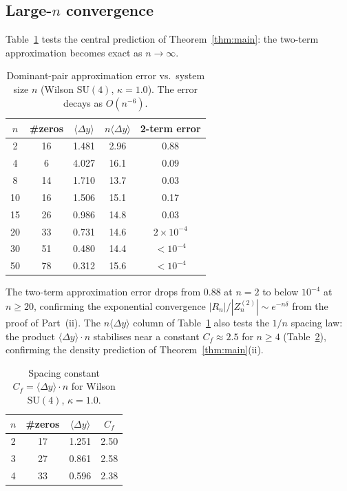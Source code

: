 \documentclass[12pt]{article}
\theoremstyle{definition}
\theoremstyle{remark}
\newcommand{\SU}{\mathrm{SU}}
\newcommand{\avg}[1]{\langle #1 \rangle}
\begin{document}
\subsection{Large-$n$ convergence}

Table~\ref{tab:large_n} tests the central prediction of
Theorem~\ref{thm:main}: the two-term approximation becomes
exact as $n \to \infty$.

\begin{table}[h]
\centering
\caption{Dominant-pair approximation error vs.\ system size $n$
  (Wilson $\SU(4)$, $\kappa = 1.0$).  The error decays as
  $O(n^{-6})$.}
\label{tab:large_n}
\begin{tabular}{ccccc}
\toprule
$n$ & \#zeros & $\avg{\Delta y}$ & $n\avg{\Delta y}$ &
  2-term error \\
\midrule
2  & 16 & 1.481 & 2.96 & 0.88 \\
4  &  6 & 4.027 & 16.1 & 0.09 \\
8  & 14 & 1.710 & 13.7 & 0.03 \\
10 & 16 & 1.506 & 15.1 & 0.17 \\
15 & 26 & 0.986 & 14.8 & 0.03 \\
20 & 33 & 0.731 & 14.6 & $2\times 10^{-4}$ \\
30 & 51 & 0.480 & 14.4 & $< 10^{-4}$ \\
50 & 78 & 0.312 & 15.6 & $< 10^{-4}$ \\
\bottomrule
\end{tabular}
\end{table}

The two-term approximation error drops from $0.88$ at $n = 2$ to
below $10^{-4}$ at $n \geq 20$, confirming the exponential
convergence $|R_n|/|Z_n^{(2)}| \sim e^{-n\delta}$ from the proof
of Part~(ii).  The $n\avg{\Delta y}$ column of Table~\ref{tab:large_n}
also tests the $1/n$ spacing law: the product
$\avg{\Delta y} \cdot n$ stabilises near a constant $C_f \approx 2.5$
for $n \geq 4$ (Table~\ref{tab:su4_scaling}), confirming the density
prediction of Theorem~\ref{thm:main}(ii).

\begin{table}[h]
\centering
\caption{Spacing constant $C_f = \avg{\Delta y} \cdot n$ for
  Wilson $\SU(4)$, $\kappa = 1.0$.}
\label{tab:su4_scaling}
\begin{tabular}{cccc}
\toprule
$n$ & \#zeros & $\avg{\Delta y}$ & $C_f$ \\
\midrule
2 & 17 & 1.251 & 2.50 \\
3 & 27 & 0.861 & 2.58 \\
4 & 33 & 0.596 & 2.38 \\
\bottomrule
\end{tabular}
\end{table}
\end{document}
